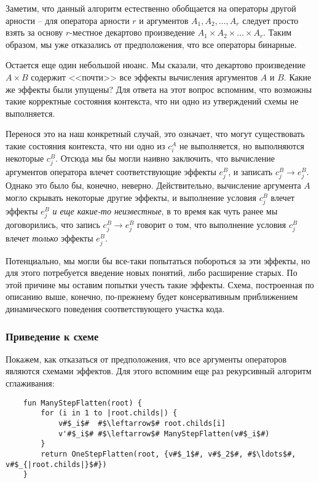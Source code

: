 Заметим, что данный алгоритм естественно обобщается на операторы другой арности -- для оператора арности $r$ и аргументов $A_1, A_2, \ldots, A_r$ следует просто взять за основу $r$-местное декартово произведение $A_1 \times A_2 \times \ldots \times A_r$. Таким образом, мы уже отказались от предположения, что все операторы бинарные.

\bigskip

Остается еще один небольшой нюанс. Мы сказали, что декартово произведение $A \times B$ содержит <<почти>> все эффекты вычисления аргументов $A$ и $B$. Какие же эффекты были упущены? Для ответа на этот вопрос вспомним, что возможны такие корректные состояния контекста, что ни одно из утверждений схемы не выполняется.

Перенося это на наш конкретный случай, это означает, что могут существовать такие состояния контекста, что ни одно из $c^A_i$ не выполняется, но выполняются некоторые $c^B_j$. Отсюда мы бы могли наивно заключить, что вычисление аргументов оператора влечет соответствующие эффекты $e^B_j$, и записать $c^B_j \rightarrow e^B_j$. Однако это было бы, конечно, неверно. Действительно, вычисление аргумента $A$ могло скрывать некоторые другие эффекты, и выполнение условия $c^B_j$ влечет эффекты $e^B_j$ \emph{и еще какие-то неизвестные}, в то время как чуть ранее мы договорились, что запись $c^B_j \rightarrow e^B_j$ говорит о том, что выполнение условия $c^B_j$ влечет \emph{только} эффекты $e^B_j$.

Потенциально, мы могли бы все-таки попытаться побороться за эти эффекты, но для этого потребуется введение новых понятий, либо расширение старых. По этой причине мы оставим попытки учесть такие эффекты. Схема, построенная по описанию выше, конечно, по-прежнему будет консервативным приближением динамического поведения соответствующего участка кода. 




\subsubsection{Приведение к схеме}

Покажем, как отказаться от предположения, что все аргументы операторов являются схемами эффектов. Для этого вспомним еще раз рекурсивный алгоритм сглаживания:

\begin{verbatim}
	fun ManyStepFlatten(root) {
	    for (i in 1 to |root.childs|) {
		    v#$_i$#  #$\leftarrow$# root.childs[i]
		    v'#$_i$# #$\leftarrow$# ManyStepFlatten(v#$_i$#) 
	    }
	    return OneStepFlatten(root, {v#$_1$#, v#$_2$#, #$\ldots$#, v#$_{|root.childs|}$#})
	}
\end{verbatim}

